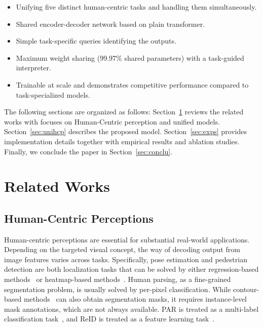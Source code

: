 \documentclass[10pt,twocolumn,letterpaper]{article}
\begin{document}
\begin{itemize}[noitemsep]
  \item[\tiny\ding{110}] Unifying five distinct human-centric tasks and handling them simultaneously.
  \item[\tiny\ding{110}] Shared encoder-decoder network based on plain transformer.
  \item[\tiny\ding{110}] Simple task-specific queries identifying the outputs. 
  \item[\tiny\ding{110}] Maximum weight sharing (99.97\% shared parameters) with a task-guided interpreter.\item[\tiny\ding{110}] Trainable at scale and demonstrates competitive performance compared to task-specialized models.
\end{itemize} 

The following sections are organized as follows: Section~\ref{sec:related} reviews the related works with focuses on Human-Centric perception and unified models. Section~\ref{sec:unihcp} describes the proposed model. Section~\ref{sec:exps} provides implementation details together with empirical results and ablation studies. Finally, we conclude the paper in Section~\ref{sec:conclu}.


























\section{Related Works}
\label{sec:related}


\subsection{Human-Centric Perceptions}
Human-centric perceptions are essential for substantial real-world applications. Depending on the targeted visual concept, the way of decoding output from image features varies across tasks. Specifically, pose estimation and pedestrian detection are both localization tasks that can be solved by either regression-based methods~\cite{li2021human,zhang2016far} or heatmap-based methods~\cite{xiao2018simple,law2018cornernet,law2019cornernet}. Human parsing, as a fine-grained segmentation problem, is usually solved by per-pixel classification. While contour-based methods~\cite{xie2020polarmask,peng2020deep} can also obtain segmentation masks, it requires instance-level mask annotations, which are not always available. PAR is treated as a multi-label classification task~\cite{zhu2017multi}, and ReID is treated as a feature learning task~\cite{sun2020circle}.
\end{document}
